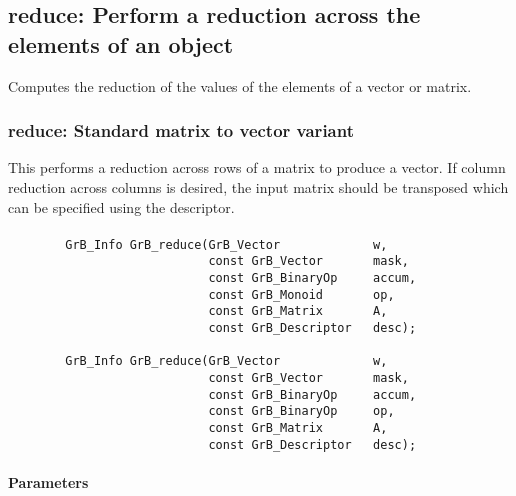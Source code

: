 
\subsection{{\sf reduce}: Perform a reduction across the elements of an object}

Computes the reduction of the values of the elements of a vector or matrix.


\subsubsection{{\sf reduce}: Standard matrix to vector variant}

This performs a reduction across rows of a matrix to produce a vector.  If column 
reduction across columns is desired, the input matrix should be transposed which can 
be specified using the descriptor.

\paragraph{\syntax}

\begin{verbatim}
        GrB_Info GrB_reduce(GrB_Vector             w,
                            const GrB_Vector       mask,
                            const GrB_BinaryOp     accum,
                            const GrB_Monoid       op,  
                            const GrB_Matrix       A,
                            const GrB_Descriptor   desc);
                            
        GrB_Info GrB_reduce(GrB_Vector             w,
                            const GrB_Vector       mask,
                            const GrB_BinaryOp     accum,
                            const GrB_BinaryOp     op,  
                            const GrB_Matrix       A,
                            const GrB_Descriptor   desc);
\end{verbatim}

\paragraph{Parameters}

